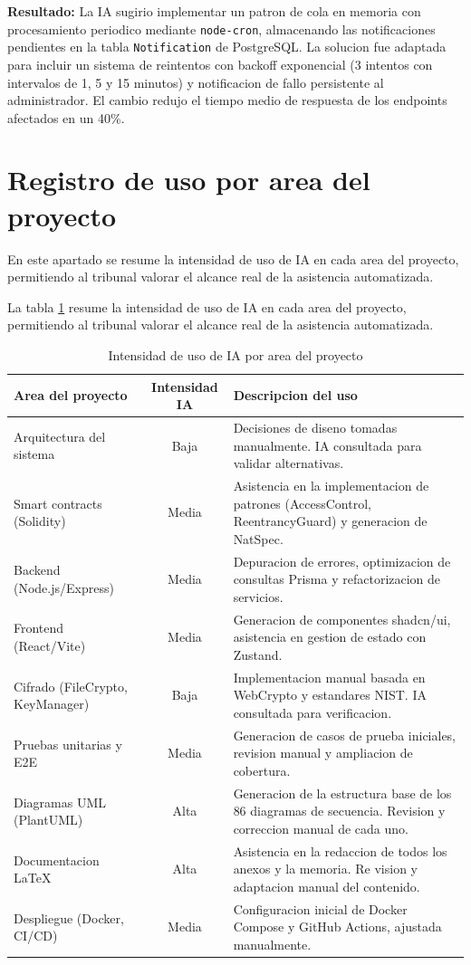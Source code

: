 \documentclass[11pt, a4paper]{article}
\begin{document}
\textbf{Resultado:} La IA sugirio implementar un patron de cola en memoria con procesamiento periodico mediante \texttt{node-cron}, almacenando las notificaciones pendientes en la tabla \texttt{Notification} de PostgreSQL. La solucion fue adaptada para incluir un sistema de reintentos con backoff exponencial (3 intentos con intervalos de 1, 5 y 15 minutos) y notificacion de fallo persistente al administrador. El cambio redujo el tiempo medio de respuesta de los endpoints afectados en un 40\%.

\section{Registro de uso por area del proyecto}

En este apartado se resume la intensidad de uso de IA en cada area del proyecto, permitiendo al tribunal valorar el alcance real de la asistencia automatizada.

La tabla \ref{tab:ia-uso-areas} resume la intensidad de uso de IA en cada area del proyecto, permitiendo al tribunal valorar el alcance real de la asistencia automatizada.

\begin{table}[H]
\centering
\renewcommand{\arraystretch}{1.4}
\small
\begin{tabular}{|l|c|p{8cm}|}
\hline
\textbf{Area del proyecto} & \textbf{Intensidad IA} & \textbf{Descripcion del uso} \\
\hline
Arquitectura del sistema & Baja & Decisiones de diseno tomadas manualmente. IA consultada para validar alternativas. \\
\hline
Smart contracts (Solidity) & Media & Asistencia en la implementacion de patrones (AccessControl, ReentrancyGuard) y generacion de NatSpec. \\
\hline
Backend (Node.js/Express) & Media & Depuracion de errores, optimizacion de consultas Prisma y refactorizacion de servicios. \\
\hline
Frontend (React/Vite) & Media & Generacion de componentes shadcn/ui, asistencia en gestion de estado con Zustand. \\
\hline
Cifrado (FileCrypto, KeyManager) & Baja & Implementacion manual basada en WebCrypto y estandares NIST. IA consultada para verificacion. \\
\hline
Pruebas unitarias y E2E & Media & Generacion de casos de prueba iniciales, revision manual y ampliacion de cobertura. \\
\hline
Diagramas UML (PlantUML) & Alta & Generacion de la estructura base de los 86 diagramas de secuencia. Revision y correccion manual de cada uno. \\
\hline
Documentacion LaTeX & Alta & Asistencia en la redaccion de todos los anexos y la memoria. Re vision y adaptacion manual del contenido. \\
\hline
Despliegue (Docker, CI/CD) & Media & Configuracion inicial de Docker Compose y GitHub Actions, ajustada manualmente. \\
\hline
\end{tabular}
\caption{Intensidad de uso de IA por area del proyecto}
\label{tab:ia-uso-areas}
\end{table}
\end{document}
